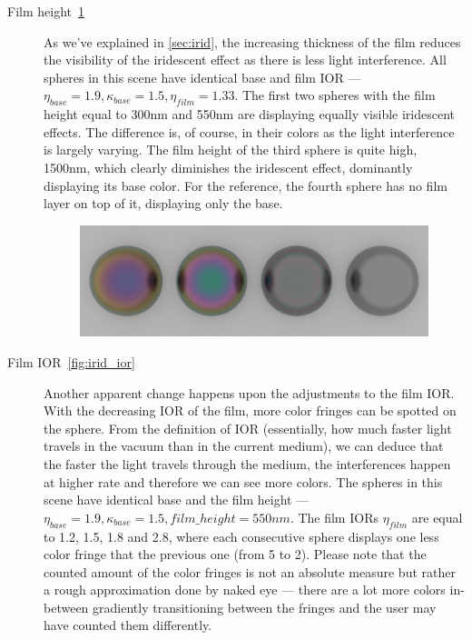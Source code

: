 \begin{description}
	\item[Film height~\ref{fig:irid_height}] As we've explained in \autoref{sec:irid}, the increasing thickness of the film reduces the visibility of the iridescent effect as there is less light interference. All spheres in this scene have identical base and film IOR --- $\eta_{base}=1.9, \kappa_{base}=1.5, \eta_{film}=1.33$. The first two spheres with the film height equal to 300nm and 550nm are displaying equally visible iridescent effects. The difference is, of course, in their colors as the light interference is largely varying. The film height of the third sphere is quite high, 1500nm, which clearly diminishes the iridescent effect, dominantly displaying its base color. For the reference, the fourth sphere has no film layer on top of it, displaying only the base.
	\begin{figure}[H]
		\centering
		\includegraphics[width=.9\linewidth]{img/iridescent_spheres_height.png}
		\caption{}
		\label{fig:irid_height}
	\end{figure}
	\item[Film IOR~\ref{fig:irid_ior}] Another apparent change happens upon the adjustments to the film IOR. With the decreasing IOR of the film, more color fringes can be spotted on the sphere. From the definition of IOR (essentially, how much faster light travels in the vacuum than in the current medium), we can deduce that the faster the light travels through the medium, the interferences happen at higher rate and therefore we can see more colors. The spheres in this scene have identical base and the film height --- $\eta_{base}=1.9, \kappa_{base}=1.5, film\_height=550nm$. The film IORs $\eta_{film}$ are equal to 1.2, 1.5, 1.8 and 2.8, where each consecutive sphere displays one less color fringe that the previous one (from 5 to 2). Please note that the counted amount of the color fringes is not an absolute measure but rather a rough approximation done by naked eye --- there are a lot more colors in-between gradiently transitioning between the fringes and the user may have counted them differently.
	\begin{figure}[H]

\end{figure}
\end{description}
